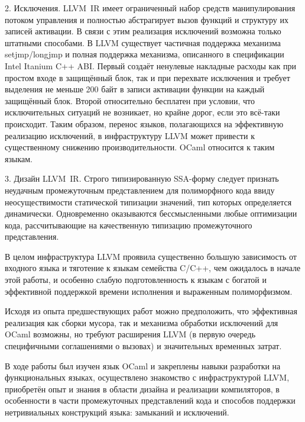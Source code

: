 \documentclass[a4paper, 12pt]{article}
\begin{document}
2. Исключения. LLVM~IR имеет ограниченный набор средств манипулирования потоком управления и полностью абстрагирует
вызов функций и структуру их записей активации. В связи с этим реализация исключений возможна только штатными способами.
В LLVM существует частичная поддержка механизма setjmp/longjmp и полная поддержка механизма, описанного в спецификации
Intel Itanium C++ ABI. Первый создаёт ненулевые накладные расходы как при простом входе в защищённый блок, так и при
перехвате исключения и требует выделения не меньше 200 байт в записи активации функции на каждый защищённый блок. Второй
относительно бесплатен при условии, что исключительных ситуаций не возникает, но крайне дорог, если это всё-таки
происходит. Таким образом, перенос языков, полагающихся на эффективную реализацию исключений, в инфраструктуру LLVM
может привести к существенному снижению производительности. OCaml относится к таким языкам.

3. Дизайн LLVM~IR. Строго типизированную SSA-форму следует признать неудачным промежуточным представлением
для полиморфного кода ввиду неосуществимости статической типизации значений, тип которых определяется динамически.
Одновременно оказываются бессмысленными любые оптимизации кода, рассчитывающие на качественную типизацию промежуточного
представления.

В целом инфраструктура LLVM проявила существенно большую зависимость от входного языка и тяготение к языкам
семейства C/C++, чем ожидалось в начале этой работы, и особенно слабую подготовленность к языкам с богатой и эффективной
поддержкой времени исполнения и выраженным полиморфизмом.

Исходя из опыта предшествующих работ можно предположить, что эффективная реализация как сборки мусора, так и
механизма обработки исключений для OCaml возможны, но требуют расширения LLVM (в первую очередь специфичными
соглашениями о вызовах) и значительных временных затрат.

В ходе работы был изучен язык OCaml и закреплены навыки разработки на функциональных языках, осуществлено знакомство с
инфраструктурой LLVM, приобретён опыт и знания в области дизайна и реализации компиляторов, в особенности в части
промежуточных представлений кода и способов поддержки нетривиальных конструкций языка: замыканий и исключений.
\end{document}
